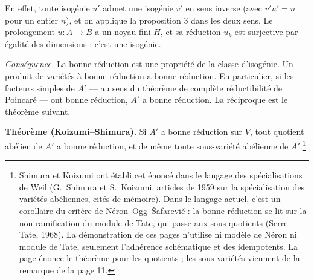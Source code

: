 \documentclass[11pt,a4paper]{article}
\begin{document}
En effet, toute isogénie $u'$ admet une isogénie $v'$ en sens inverse (avec
$v' u' = n$ pour un entier $n$), et on applique la proposition 3 dans les deux
sens. Le prolongement $u \colon A \to B$ a un noyau fini $H$, et sa réduction
$u_k$ est surjective par égalité des dimensions : c'est une isogénie.

\emph{Conséquence.} La bonne réduction est une propriété de la classe
d'isogénie. Un produit de variétés à bonne réduction a bonne réduction. En
particulier, si les facteurs simples de $A'$ --- au sens du théorème de
complète réductibilité de Poincaré --- ont bonne réduction, $A'$ a bonne
réduction. La réciproque est le théorème suivant.

\textbf{Théorème (Koizumi--Shimura).} Si $A'$ a bonne réduction sur $V$, tout
quotient abélien de $A'$ a bonne réduction, et de même toute sous-variété
abélienne de $A'$.\footnote{Shimura et Koizumi ont établi cet énoncé dans le
langage des spécialisations de Weil (G.~Shimura et S.~Koizumi, articles de 1959
sur la spécialisation des variétés abéliennes, cités de mémoire). Dans le
langage actuel, c'est un corollaire du critère de Néron--Ogg--Šafarevič : la
bonne réduction se lit sur la non-ramification du module de Tate, qui passe
aux sous-quotients (Serre--Tate, 1968). La démonstration de ces pages n'utilise
ni modèle de Néron ni module de Tate, seulement l'adhérence schématique et des
idempotents. La page énonce le théorème pour les quotients ; les
sous-variétés viennent de la remarque de la page 11.}
\end{document}
